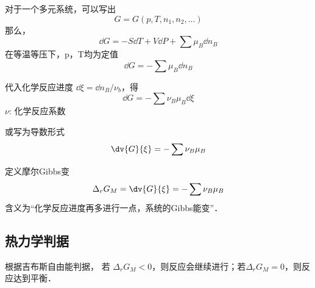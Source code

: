 
\begin{issues}
\issueDraft
\end{issues}


对于一个多元系统，可以写出
\begin{equation}
G=G(p,T,n_1,n_2,...)
\end{equation}
那么，
\begin{equation}
\dd G=-S \dd T +V \dd P + \sum \mu_B \dd n_B
\end{equation}
在等温等压下，p，T均为定值
\begin{equation}
\dd G=-\sum \mu_B \dd n_B
\end{equation}

代入化学反应进度 $\dd \xi=\dd n_B/\nu_b$，得
\begin{equation}
\dd G=-\sum \nu_B \mu_B \dd \xi
\end{equation}
$\nu$: 化学反应系数

或写为导数形式
\begin{equation}
\dv{G}{\xi}=-\sum \nu_B \mu_B
\end{equation}

定义摩尔Gibbs变
\begin{equation}
\Delta _r G_M = \dv{G}{\xi}=-\sum \nu_B \mu_B
\end{equation}
含义为“化学反应进度再多进行一点，系统的Gibbs能变”．

\subsection{热力学判据}
根据吉布斯自由能判据，
若 $\Delta _r G_M<0$，则反应会继续进行；若$\Delta _r G_M = 0$，则反应达到平衡．

